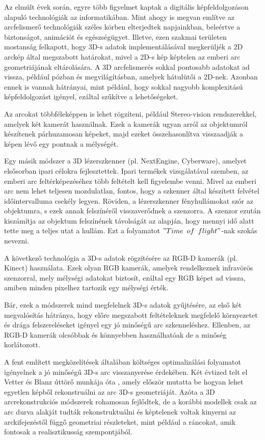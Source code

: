 \documentclass[12pt,a4]{article}
\begin{document}
	   Az elmúlt évek során, egyre több figyelmet kaptak a digitális
	 képfeldolgozáson alapuló technológiák az informatikában. Mint ahogy \cite{survey} is megvan említve az arcfelismerő technológiák széles
	 körben elterjedtek napjainkban, beleértve a biztonságot, animációt és egészségügyet. Illetve, ezen szakmai területen mostanság felkapott,
	 hogy 3D-s adatok implementálásával megkerüljék a 2D arckép által megszabott határokat, mivel a 2D-s kép képtelen az emberi arc geometriájának eltárolására.
	 A 3D arcfelismerés sokkal pontosabb adatokat ad vissza, például pózban és megvilágításban, amelyek hátulütői a 2D-nek. Azonban ennek is vannak hátrányai, mint például, hogy sokkal nagyobb komplexitású képfeldolgozást igényel, ezáltal szűkítve a lehetőségeket.
  
Az arcokat többféleképpen is lehet rögzíteni, például Stereo-vision rendszerekkel, amelyek két kamerát használnak. Ezek a kamerák ugyan arról az objektumról készítenek párhuzamosan képeket, majd ezeket összehasonlítva visszaadják a képen lévő egy pontnak a mélységét.  

Egy másik módszer a 3D lézerszkenner (pl. NextEngine, Cyberware), amelyet elsősorban ipari célokra fejlesztettek. Ipari termékek vizsgálatával szemben, az emberi arc feltérképezéséhez több feltételt kell figyelembe venni. Mivel az emberi arc nem lehet teljesen mozdulatlan, fontos, hogy a szkenner által készített felvétel időintervalluma csekély legyen.
Röviden, a lézerszkenner fényhullámokat szór az objektumra, s ezek annak felszínéről visszaverődnek a szenzorra. A szenzor ezután kiszámítja az objektum felszínének távolságát az alapján, hogy mennyi idő alatt tette meg a teljes utat a hullám. Ezt a folyamatot $"Time\enspace of\enspace flight"$-nak szokás nevezni. 
  
	 A következő technológia a 3D-s adatok rögzítésére az RGB-D kamerák (pl. Kinect) használata. Ezek olyan RGB kamerák, amelyek rendelkeznek infravörös szenzorral, mely mélységi adatokat biztosít, ezáltal egy RGB képet ad vissza, amiben minden pixelhez tartozik egy mélységi érték.
  
	 Bár, ezek a módszerek mind megfelelnek 3D-s adatok gyűjtésére, az első két megvalósítás hátránya, hogy előre megszabott feltételeknek megfelelő környezetet és drága felszereléseket igényel egy jó minőségű arc szkenneléshez. Ellenben, az RGB-D kamerák olcsóbbak és könnyebben használhatóak de a minőség korlátozott.
  
	 A fent említett megközelítések általában költséges optimalizálási folyamatot igényelnek a jó minőségű 3D-s arc visszanyerése érdekében. Két évtized telt el Vetter és Blanz úttörő munkája óta \cite{blanzvetter}, amely először mutatta be hogyan lehet egyetlen képből rekonstruálni az arc 3D-s geometriáját. Azóta a 3D arcrekonstrukciós módszerek rohamosan fejlődtek, de a korábbi modellek csak az arc durva alakját tudták rekonstruktuálni és képtelenek voltak kinyerni az arckifejezéstől függő geometriai részleteket, mint például a ráncokat, amik fontosak a realisztikusság szempontjából.
	 
\end{document}
